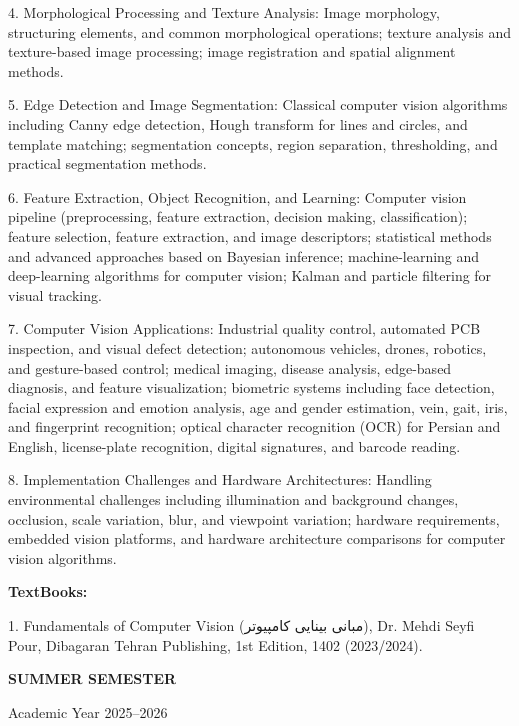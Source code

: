 \documentclass[12pt,a4paper]{article}
\begin{document}
4. Morphological Processing and Texture Analysis: Image morphology, structuring elements, and common morphological operations; texture analysis and texture-based image processing; image registration and spatial alignment methods.\par
5. Edge Detection and Image Segmentation: Classical computer vision algorithms including Canny edge detection, Hough transform for lines and circles, and template matching; segmentation concepts, region separation, thresholding, and practical segmentation methods.\par
6. Feature Extraction, Object Recognition, and Learning: Computer vision pipeline (preprocessing, feature extraction, decision making, classification); feature selection, feature extraction, and image descriptors; statistical methods and advanced approaches based on Bayesian inference; machine-learning and deep-learning algorithms for computer vision; Kalman and particle filtering for visual tracking.\par
7. Computer Vision Applications: Industrial quality control, automated PCB inspection, and visual defect detection; autonomous vehicles, drones, robotics, and gesture-based control; medical imaging, disease analysis, edge-based diagnosis, and feature visualization; biometric systems including face detection, facial expression and emotion analysis, age and gender estimation, vein, gait, iris, and fingerprint recognition; optical character recognition (OCR) for Persian and English, license-plate recognition, digital signatures, and barcode reading.\par
8. Implementation Challenges and Hardware Architectures: Handling environmental challenges including illumination and background changes, occlusion, scale variation, blur, and viewpoint variation; hardware requirements, embedded vision platforms, and hardware architecture comparisons for computer vision algorithms.\par\vspace{4pt}
\textbf{TextBooks:}\par\vspace{2pt}
1. Fundamentals of Computer Vision (مبانی بینایی کامپیوتر), Dr. Mehdi Seyfi Pour, Dibagaran Tehran Publishing, 1st Edition, 1402 (2023/2024).\par
\vspace{4pt}

\newpage
\vspace*{\fill}
\begin{center}
  {\fontsize{28pt}{34pt}\selectfont \textbf{SUMMER SEMESTER}}\par\vspace{12pt}
  {\fontsize{13pt}{17pt}\selectfont Academic Year 2025–2026}
\end{center}
\vspace*{\fill}
\end{document}
